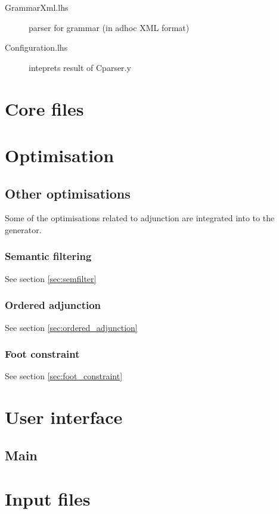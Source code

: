 \documentclass[11pt]{report}
\begin{document}
\begin{description}
 \item[GrammarXml.lhs] parser for grammar (in adhoc XML format)
 \item[Configuration.lhs] inteprets result of Cparser.y
\end{description}



\part{Core files}

       
       
       
       

\part{Optimisation}

       
% 

\chapter{Other optimisations}
\label{chp:other_optimisations}

Some of the optimisations related to adjunction are integrated into
to the generator.

\section{Semantic filtering}

See section \ref{sec:semfilter}

\section{Ordered adjunction}

See section \ref{sec:ordered_adjunction}

\section{Foot constraint}

See section \ref{sec:foot_constraint}

\part{User interface}

\chapter{Main}






\part{Input files}



\end{document}
